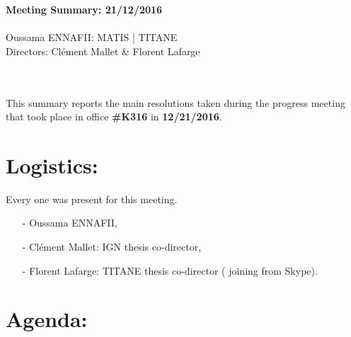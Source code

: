 \documentclass[a4paper, 11pt]{article}
\begin{document}
	\begin{centering}
		\large\textbf{Meeting Summary: 21/12/2016}\\
		~\\
		Oussama ENNAFII:
		\normalsize MATIS | TITANE \\
		Directors: Cl\'ement Mallet \& Florent Lafarge \\
	\end{centering}
	
	~\\~\\
	This summary reports the main resolutions taken during the progress meeting that took place in office \textbf{\#K316} in \textbf{12/21/2016}.
	\section*{Logistics:}
	Every one was present for this meeting.
	\begin{itemize}
		\item[-] Oussama ENNAFII,
		\item[-] Cl\'ement Mallet: IGN thesis co-director,
		\item[-] Florent Lafarge: TITANE thesis co-director ( joining from Skype).
	\end{itemize}
	
	\section*{Agenda:}
	
\end{document}
